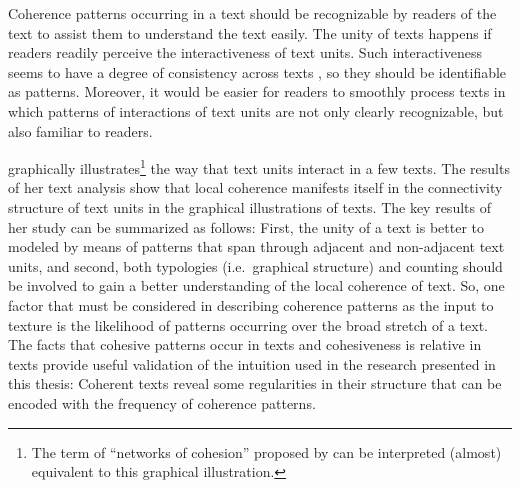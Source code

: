 
Coherence patterns occurring in a text should be recognizable by readers of the text to assist them to understand the text easily.  
The unity of texts happens if readers readily perceive the interactiveness of text units.  
Such interactiveness seems to have a degree of consistency across texts \cite{stoddard91}, so they should be identifiable as patterns.  
Moreover, it would be easier for readers to smoothly process texts in which  patterns of interactions of text units are not only clearly recognizable, but also familiar to readers.  
 
 graphically illustrates\footnote{
The term of ``networks of cohesion'' proposed by  can be interpreted (almost) equivalent to this graphical illustration.} the way that text units interact in a few texts. 
The results of her text analysis show that local coherence manifests itself in the connectivity structure of text units in the graphical illustrations of texts.  
The key results of her study can be summarized as follows:
First, the unity of a text is better to modeled by means of patterns that span through adjacent and non-adjacent text units, and second, 
both typologies (i.e.\ graphical structure) and counting should be involved to gain a better understanding of the local coherence of text.  
So, one factor that must be considered in describing coherence patterns as the input to texture is the likelihood of patterns occurring over the broad stretch of a text.  
The facts that cohesive patterns occur in texts and cohesiveness is relative in texts provide useful validation of the intuition used in the research presented in this thesis: Coherent texts reveal some regularities in their structure that can be encoded with the frequency of coherence patterns. 

